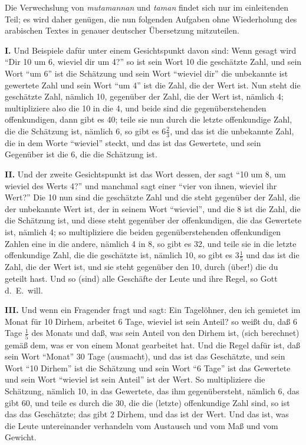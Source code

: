 \documentclass[11pt,a4paper]{article}
\newcommand{\enquote}[1]{``#1''}
\begin{document}
Die Verwechslung von \textit{mutamannan} und \textit{taman} findet sich nur im einleitenden Teil; es wird daher gen\"ugen, die nun folgenden Aufgaben ohne Wiederholung des arabischen Textes in genauer deutscher \"Ubersetzung mitzuteilen.

\textbf{I.} Und Beispiele daf\"ur unter einem Gesichtspunkt davon sind: Wenn gesagt wird \enquote{Dir 10 um 6, wieviel dir um 4?} so ist sein Wort 10 die gesch\"atzte Zahl, und sein Wort \enquote{um 6} ist die Sch\"atzung und sein Wort \enquote{wieviel dir} die unbekannte ist gewertete Zahl und sein Wort \enquote{um 4} ist die Zahl, die der Wert ist. Nun steht die gesch\"atzte Zahl, n\"amlich 10, gegen\"uber der Zahl, die der Wert ist, n\"amlich 4; multipliziere also die 10 in die 4, und beide sind die gegen\"uberstehenden offenkundigen, dann gibt es 40; teile sie nun durch die letzte offenkundige Zahl, die die Sch\"atzung ist, n\"amlich 6, so gibt es $6\frac{2}{3}$, und das ist die unbekannte Zahl, die in dem Worte \enquote{wieviel} steckt, und das ist das Gewertete, und sein Gegen\"uber ist die 6, die die Sch\"atzung ist.

\textbf{II.} Und der zweite Gesichtspunkt ist das Wort dessen, der sagt \enquote{10 um 8, um wieviel des Werts 4?} und manchmal sagt einer \enquote{vier von ihnen, wieviel ihr Wert?} Die 10 nun sind die gesch\"atzte Zahl und die steht gegen\"uber der Zahl, die der unbekannte Wert ist, der in seinem Wort \enquote{wieviel}, und die 8 ist die Zahl, die die Sch\"atzung ist, und diese steht gegen\"uber der offenkundigen, die das Gewertete ist, n\"amlich 4; so multipliziere die beiden gegen\"uberstehenden offenkundigen Zahlen eine in die andere, n\"amlich 4 in 8, so gibt es 32, und teile sie in die letzte offenkundige Zahl, die die gesch\"atzte ist, n\"amlich 10, so gibt es $3\frac{1}{5}$ und das ist die Zahl, die der Wert ist, und sie steht gegen\"uber den 10, durch (\"uber!) die du geteilt hast. Und so (sind) alle Gesch\"afte der Leute und ihre Regel, so Gott d.\ E.\ will.

\textbf{III.} Und wenn ein Fragender fragt und sagt: Ein Tagel\"ohner, den ich gemietet im Monat f\"ur 10 Dirhem, arbeitet 6 Tage, wieviel ist sein Anteil? so wei\ss{}t du, da\ss{} 6 Tage $\frac{1}{5}$ des Monats und da\ss{}, was sein Anteil von den Dirhem ist, (sich berechnet) gem\"a\ss{} dem, was er von einem Monat gearbeitet hat. Und die Regel daf\"ur ist, da\ss{} sein Wort \enquote{Monat} 30 Tage (ausmacht), und das ist das Gesch\"atzte, und sein Wort \enquote{10 Dirhem} ist die Sch\"atzung und sein Wort \enquote{6 Tage} ist das Gewertete und sein Wort \enquote{wieviel ist sein Anteil} ist der Wert. So multipliziere die Sch\"atzung, n\"amlich 10, in das Gewertete, das ihm gegen\"ubersteht, n\"amlich 6, das gibt 60, und teile es durch die 30, die die (letzte) offenkundige Zahl sind, so ist das das Gesch\"atzte; das gibt 2 Dirhem, und das ist der Wert. Und das ist, was die Leute untereinander verhandeln vom Austausch und vom Ma\ss{} und vom Gewicht.
\end{document}

